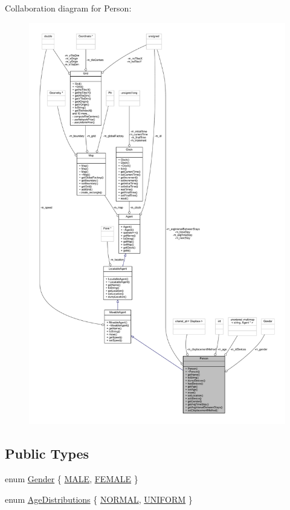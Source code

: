 Collaboration diagram for Person\+:\nopagebreak
\begin{figure}[H]
\begin{center}
\leavevmode
\includegraphics[width=350pt]{class_person__coll__graph}
\end{center}
\end{figure}
\subsection*{Public Types}
\begin{DoxyCompactItemize}
\item 
enum \hyperlink{class_person_aff84ca16bd4dbf364614d86f20b29dd2}{Gender} \{ \hyperlink{class_person_aff84ca16bd4dbf364614d86f20b29dd2a16691f7cc6595f87b71d9b43ad23fcb4}{M\+A\+LE}, 
\hyperlink{class_person_aff84ca16bd4dbf364614d86f20b29dd2a8ee21010fb2d8e8794ef72be368da064}{F\+E\+M\+A\+LE}
 \}
\item 
enum \hyperlink{class_person_a53376a9a5852ec7760488a01c37f0b0b}{Age\+Distributions} \{ \hyperlink{class_person_a53376a9a5852ec7760488a01c37f0b0ba7e4e1da74c9858476e0149deef9458c4}{N\+O\+R\+M\+AL}, 
\hyperlink{class_person_a53376a9a5852ec7760488a01c37f0b0ba4cf35976a167c4ac001a3eed2920a9b0}{U\+N\+I\+F\+O\+RM}
 \}
\end{DoxyCompactItemize}
